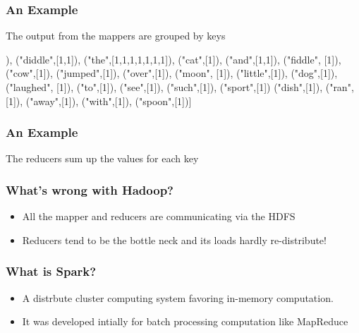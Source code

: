 \documentclass{beamer}
\newcommand{\beb}{\begin{exampleblock}}
\newcommand{\eeb}{\end{exampleblock}}
\begin{document}
\begin{frame}[fragile]
\frametitle{An Example}

\beb{The output from the mappers are grouped by keys}
{\scriptsize
\begin{code}
[("hey",[1]),
 ("diddle",[1,1]),
 ("the",[1,1,1,1,1,1,1]),
 ("cat",[1]), 
 ("and",[1,1]),
 ("fiddle", [1]),
 ("cow",[1]), 
 ("jumped",[1]), 
 ("over",[1]),
 ("moon", [1]),
 ("little",[1]), 
 ("dog",[1]), 
 ("laughed", [1]),
 ("to",[1]), 
 ("see",[1]), 
 ("such",[1]),
 ("sport",[1])
 ("dish",[1]), 
 ("ran",[1]), 
 ("away",[1]),
 ("with",[1]), 
 ("spoon",[1])]
\end{code}
}
\eeb
\end{frame}

\begin{frame}[fragile]
\frametitle{An Example}
\beb{The reducers sum up the values for each key}
{\scriptsize
\begin{code}
\end{code}
}
\eeb
\end{frame}


\begin{frame}
\frametitle{What's wrong with Hadoop?}
\begin{itemize}
\item All the mapper and reducers are communicating via the HDFS
\item Reducers tend to be the bottle neck and its loads hardly
  re-distribute!
\end{itemize}
\end{frame}






\begin{frame}
\frametitle{What is Spark?}
\begin{itemize}
\item A distrbute cluster computing system favoring in-memory computation. 
\item It was developed intially for batch processing computation like MapReduce
\end{itemize}
\end{frame}
\end{document}
